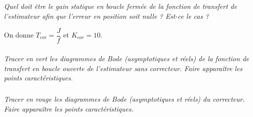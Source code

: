 \documentclass[10pt]{article}
\begin{document}
\subparagraph{}
\textit{Quel doit être le gain statique en boucle fermée de la fonction de transfert de l’estimateur afin que l'erreur en position soit nulle ? Est-ce le cas ?}

On donne $T_{cor}=\dfrac{J}{f}$ et $K_{cor}=10$.

\subparagraph{}
\textit{Tracer en vert les diagrammes de Bode (asymptotiques et réels) de la fonction de transfert en boucle ouverte de l’estimateur sans correcteur. Faire apparaître les points caractéristiques.}



\subparagraph{}
\textit{Tracer en rouge les diagrammes de Bode (asymptotiques et réels) du correcteur. Faire apparaître les points caractéristiques.}
\end{document}
